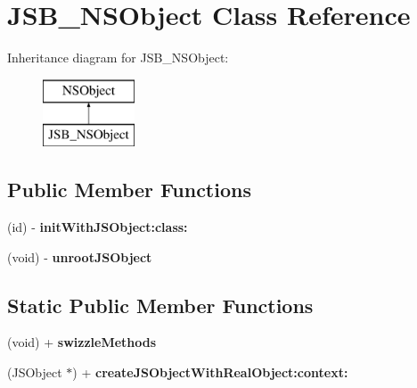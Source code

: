 \hypertarget{interface_j_s_b___n_s_object}{\section{J\-S\-B\-\_\-\-N\-S\-Object Class Reference}
\label{interface_j_s_b___n_s_object}
}
Inheritance diagram for J\-S\-B\-\_\-\-N\-S\-Object\-:\begin{figure}[H]
\begin{center}
\leavevmode
\includegraphics[height=2.000000cm]{interface_j_s_b___n_s_object}
\end{center}
\end{figure}
\subsection*{Public Member Functions}
\begin{DoxyCompactItemize}
\item 
\hypertarget{interface_j_s_b___n_s_object_a2e25dffc8274d67f5503676c0fa8ee66}{(id) -\/ {\bfseries init\-With\-J\-S\-Object\-:class\-:}}\label{interface_j_s_b___n_s_object_a2e25dffc8274d67f5503676c0fa8ee66}

\item 
\hypertarget{interface_j_s_b___n_s_object_a2b0010ffb9127800bb64ebbf6d26fb46}{(void) -\/ {\bfseries unroot\-J\-S\-Object}}\label{interface_j_s_b___n_s_object_a2b0010ffb9127800bb64ebbf6d26fb46}

\end{DoxyCompactItemize}
\subsection*{Static Public Member Functions}
\begin{DoxyCompactItemize}
\item 
\hypertarget{interface_j_s_b___n_s_object_a1b3d7f48167cac8ba61db66a7b5e2a85}{(void) + {\bfseries swizzle\-Methods}}\label{interface_j_s_b___n_s_object_a1b3d7f48167cac8ba61db66a7b5e2a85}

\item 
\hypertarget{interface_j_s_b___n_s_object_a46120df0422dc2fe000ee0b9a0b618fe}{(J\-S\-Object $\ast$) + {\bfseries create\-J\-S\-Object\-With\-Real\-Object\-:context\-:}}\label{interface_j_s_b___n_s_object_a46120df0422dc2fe000ee0b9a0b618fe}

\end{DoxyCompactItemize}
